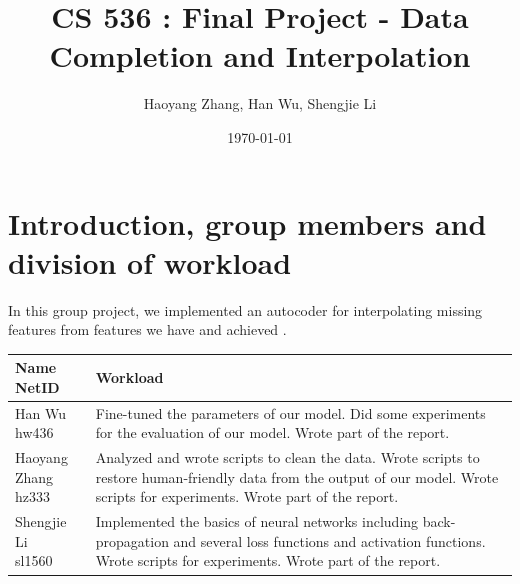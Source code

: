 \documentclass[11pt, a4paper]{article}
\title{CS 536 : Final Project - Data Completion and Interpolation}
\author{Haoyang Zhang, Han Wu, Shengjie Li}
\date{\today}
\begin{document}
\maketitle

\section{Introduction, group members and division of workload}
\label{sec:Introduction}

In this group project, we implemented an autocoder for interpolating missing features from features we have and achieved . \\
\begin{tabular}{| p{2.7cm} | p{\textwidth -3.5cm} |}
	\hline
	\makecell[c]{Name \\ NetID} & Workload \\
	\hline
	\makecell[c]{Han Wu \\ hw436} & {Fine-tuned the parameters of our model. Did some experiments for the evaluation of our model. Wrote part of the report.} \\
	\hline
	\makecell[c]{Haoyang Zhang \\ hz333} & {Analyzed and wrote scripts to clean the data. Wrote scripts to restore human-friendly data from the output of our model. Wrote scripts for experiments. Wrote part of the report. } \\
	\hline
	\makecell[c]{Shengjie Li \\ sl1560} & {Implemented the basics of neural networks including back-propagation and several loss functions and activation functions. Wrote scripts for experiments. Wrote part of the report.} \\
	\hline
\end{tabular}
\end{document}
